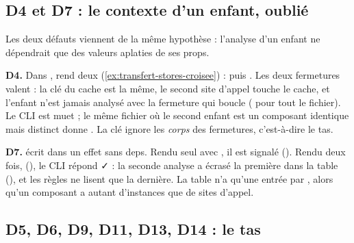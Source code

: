 \subsection{D4 et D7 : le contexte d'un enfant, oublié}

Les deux défauts viennent de la même hypothèse : l'analyse d'un enfant ne
dépendrait que des valeurs aplaties de ses props.

\textbf{D4.} Dans ,  rend deux
 (\cref{ex:transfert-stores-croisee}) :
 puis . Les
deux fermetures valent  : la clé du cache est la même,
le second site d'appel touche le cache, et l'enfant n'est jamais analysé
avec la fermeture qui boucle ( pour tout
le fichier). Le CLI est muet ; le même fichier où le second enfant est un
composant  identique mais distinct donne
. La clé ignore les \emph{corps} des
fermetures, c'est-à-dire le tas.

\textbf{D7.}  écrit  dans un
effet sans deps. Rendu seul avec , il est signalé
(). Rendu deux fois,
 (),
le CLI répond  ✓ : la seconde analyse a écrasé la
première dans la table 
(), et les règles ne lisent
que la dernière. La table n'a qu'une entrée par , alors
qu'un composant a autant d'instances que de sites d'appel.

\subsection{D5, D6, D9, D11, D13, D14 : le tas}

